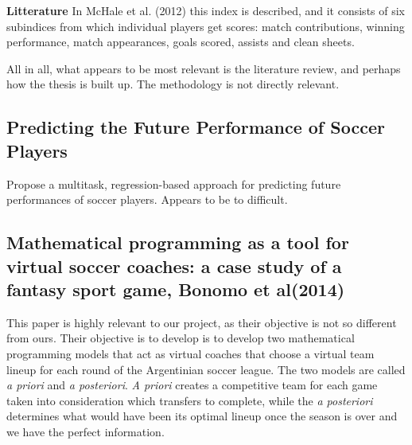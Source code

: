 \textbf{Litterature}\newline
In McHale et al. (2012) this index is described, and it consists of six subindices from which individual players get scores: match contributions, winning performance, match appearances, goals scored, assists and clean sheets.\newpar

All in all, what appears to be most relevant is the literature review, and perhaps how the thesis is built up. The methodology is not directly relevant.

\subsection{Predicting the Future Performance of Soccer Players}
Propose a multitask, regression-based approach for predicting future performances of soccer players. Appears to be to difficult.

\subsection{Mathematical programming as a tool for virtual soccer coaches: a case study of a fantasy sport game, Bonomo et al(2014)}

This paper is highly relevant to our project, as their objective is not so different from ours. Their objective is to develop is to develop two mathematical programming models that act as virtual coaches that choose a virtual team lineup for each round of the Argentinian soccer league. The two models are called \textit{a priori} and \textit{a posteriori}. \textit{A priori} creates a competitive team for each game taken into consideration which transfers to complete, while the \textit{a posteriori} determines what would have been its optimal lineup once the season is over and we have the perfect information. 

\newpar

